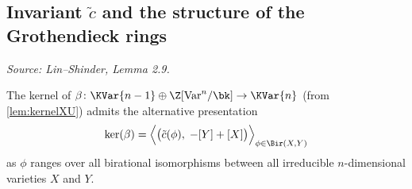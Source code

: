 \subsection{Invariant \texorpdfstring{\(\tilde{c}\)}{c-tilde} and the structure of the Grothendieck rings}


\begin{lemma}
  \label{lem:kernelXY}
  \textit{Source: Lin--Shinder, Lemma 2.9.}

  The kernel of \(\beta \colon \KVar{n-1} \oplus \Z[\mathrm{Var}^n/\bk] \to \KVar{n}\)
  (from \cref{lem:kernelXU}) admits the alternative presentation
  \[
    \ker(\beta)
    = \Bigl\langle \bigl(\tilde{c}(\phi),\; -[Y] + [X]\bigr) \Bigr\rangle_{\phi \in \Bir(X,Y)}
  \]
  as \(\phi\) ranges over all birational isomorphisms between all irreducible
  \(n\)-dimensional varieties \(X\) and \(Y\).
\end{lemma}
